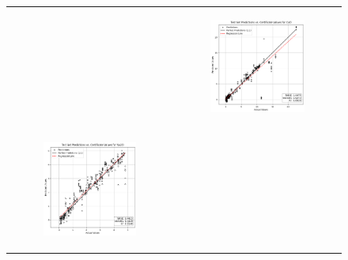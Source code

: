 \begin{figure}
{\begin{tabular}{cc}
\begin{subfigure}{0.5\textwidth}
            \end{subfigure} & \hspace{3cm}
            \begin{subfigure}{0.5\textwidth}
                \includegraphics[width=\textwidth]{images/one_to_one/enetalpha01/CaO.png}
            \end{subfigure} \\
            \begin{subfigure}{0.5\textwidth}
                \includegraphics[width=\textwidth]{images/one_to_one/enetalpha01/Na2O.png}

\end{subfigure}
\end{tabular}}
\end{figure}
